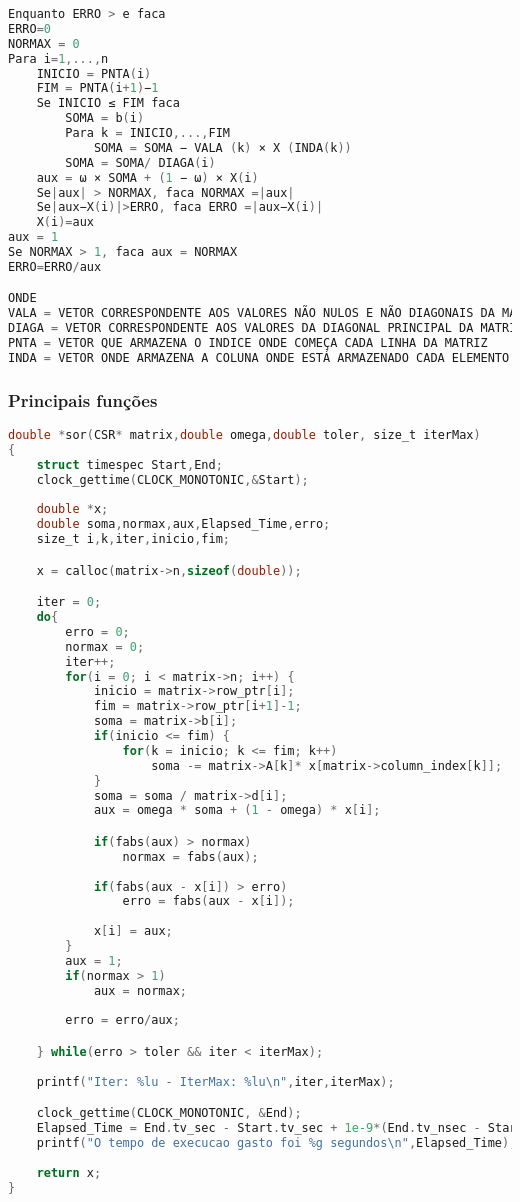 \documentclass[
	article,			%
	11pt,				%
	oneside,			%
	a4paper,			%
	english,			%
	brazil,				%
	sumario=tradicional
	]{abntex2}
\begin{document}
\begin{lstlisting}[language=C, caption=Função SOR]
Enquanto ERRO > e faca
ERRO=0
NORMAX = 0
Para i=1,...,n
    INICIO = PNTA(i)
    FIM = PNTA(i+1)−1
    Se INICIO ≤ FIM faca
        SOMA = b(i)
        Para k = INICIO,...,FIM
            SOMA = SOMA − VALA (k) × X (INDA(k))
        SOMA = SOMA/ DIAGA(i)
    aux = ω × SOMA + (1 − ω) × X(i)
    Se|aux| > NORMAX, faca NORMAX =|aux|
    Se|aux−X(i)|>ERRO, faca ERRO =|aux−X(i)|
    X(i)=aux
aux = 1
Se NORMAX > 1, faca aux = NORMAX
ERRO=ERRO/aux

ONDE 
VALA = VETOR CORRESPONDENTE AOS VALORES NÃO NULOS E NÃO DIAGONAIS DA MATRIZ
DIAGA = VETOR CORRESPONDENTE AOS VALORES DA DIAGONAL PRINCIPAL DA MATRIZ
PNTA = VETOR QUE ARMAZENA O INDICE ONDE COMEÇA CADA LINHA DA MATRIZ
INDA = VETOR ONDE ARMAZENA A COLUNA ONDE ESTÁ ARMAZENADO CADA ELEMENTO NÃO NULO E NÃO DIAGONAL DA MATRIZ
\end{lstlisting}

\subsubsection{Principais funções}
\begin{lstlisting}[language=C, caption=Pseudo código SOR]
double *sor(CSR* matrix,double omega,double toler, size_t iterMax)
{
	struct timespec Start,End;
	clock_gettime(CLOCK_MONOTONIC,&Start);
	
	double *x;
	double soma,normax,aux,Elapsed_Time,erro;
	size_t i,k,iter,inicio,fim;

	x = calloc(matrix->n,sizeof(double));

	iter = 0;
	do{
		erro = 0;
		normax = 0;
		iter++;
		for(i = 0; i < matrix->n; i++) {
			inicio = matrix->row_ptr[i];
			fim = matrix->row_ptr[i+1]-1;
			soma = matrix->b[i];
			if(inicio <= fim) {
				for(k = inicio; k <= fim; k++)
					soma -= matrix->A[k]* x[matrix->column_index[k]];
			}
			soma = soma / matrix->d[i];
			aux = omega * soma + (1 - omega) * x[i];

			if(fabs(aux) > normax)
				normax = fabs(aux);
				
			if(fabs(aux - x[i]) > erro)
				erro = fabs(aux - x[i]);
				
			x[i] = aux;
		}
		aux = 1;
		if(normax > 1)
			aux = normax;
			
		erro = erro/aux;

	} while(erro > toler && iter < iterMax);
	
	printf("Iter: %lu - IterMax: %lu\n",iter,iterMax);

	clock_gettime(CLOCK_MONOTONIC, &End);
	Elapsed_Time = End.tv_sec - Start.tv_sec + 1e-9*(End.tv_nsec - Start.tv_nsec);
	printf("O tempo de execucao gasto foi %g segundos\n",Elapsed_Time);
	
	return x;
}
\end{lstlisting}
\end{document}
